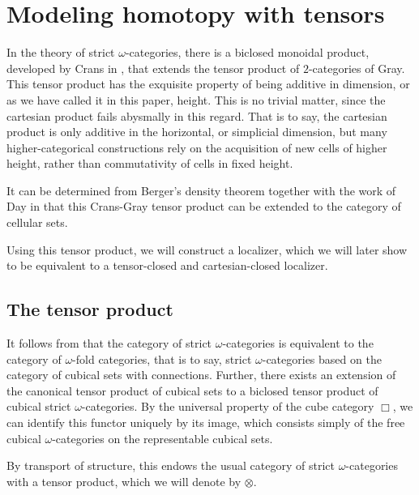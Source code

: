 \section{Modeling homotopy with tensors}
In the theory of strict \(\omega\)-categories, there is a biclosed monoidal product, developed by Crans in \cite{cransthtens}, that extends the tensor product of \(2\)-categories of Gray.  This tensor product has the exquisite property of being additive in dimension, or as we have called it in this paper, height.  This is no trivial matter, since the cartesian product fails abysmally in this regard.  That is to say, the cartesian product is only additive in the horizontal, or simplicial dimension, but many higher-categorical constructions rely on the acquisition of new cells of higher height, rather than commutativity of cells in fixed height.  

It can be determined from Berger's density theorem \cite{berger-cellular-nerve} together with the work of Day in \cite{dayconvolution} that this Crans-Gray tensor product can be extended to the category of cellular sets.  

Using this tensor product, we will construct a localizer, which we will later show to be equivalent to a tensor-closed and cartesian-closed localizer.

\subsection{The tensor product}
It follows from \cite{brown-steiner} that the category of strict \(\omega\)-categories is equivalent to the category of \(\omega\)-fold categories, that is to say, strict \(\omega\)-categories based on the category of cubical sets with connections.  Further, there exists an extension of the canonical tensor product of cubical sets to a biclosed tensor product of cubical strict \(\omega\)-categories.  By the universal property of the cube category \(\Box\), we can identify this functor uniquely by its image, which consists simply of the free cubical \(\omega\)-categories on the representable cubical sets. 

By transport of structure, this endows the usual category of strict \(\omega\)-categories with a tensor product, which we will denote by \(\otimes\).  

